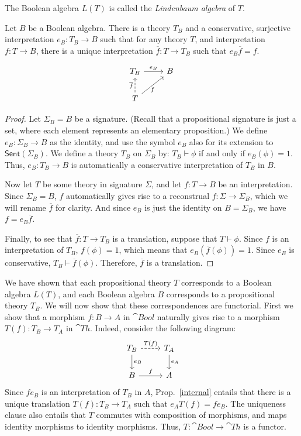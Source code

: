 \begin{defn} The Boolean algebra $L(T)$ is called the \emph{Lindenbaum
    algebra} of $T$. \end{defn}




\begin{prop} Let $B$ be a Boolean algebra.  There is a theory $T_B$
  and a conservative, surjective interpretation $e_B:T_B\to B$ such
  that for any theory $T$, and interpretation $f:T\to B$, there is a
  unique interpretation $\overline{f}:T\to T_B$ such that
  $e_B\overline{f}=f$.  \label{internal} \end{prop}

\[ \begin{tikzcd}
T_B \arrow{r}{e_B} & B  \\
T \arrow{ur}[below]{f} \arrow[dashed]{u}{\overline{f}} \end{tikzcd} \]

\begin{proof} Let $\Sigma _B=B$ be a signature.  (Recall that a
  propositional signature is just a set, where each element represents
  an elementary proposition.)  We define $e_B:\Sigma _B\to B$ as the
  identity, and use the symbol $e_B$ also for its extension to
  $\mathsf{Sent}(\Sigma _B)$.  We define a theory $T_B$ on $\Sigma _B$
  by: $T_B\vdash\phi$ if and only if $e_B(\phi )=1$.  Thus,
  $e_B:T_B\to B$ is automatically a conservative interpretation of
  $T_B$ in $B$.

  Now let $T$ be some theory in signature $\Sigma$, and let $f:T\to B$
  be an interpretation.  Since $\Sigma _B=B$, $f$ automatically gives
  rise to a reconstrual $f:\Sigma\to\Sigma _B$, which we will rename
  $\overline{f}$ for clarity.  And since $e_B$ is just the identity on
  $B=\Sigma _B$, we have $f=e_B\overline{f}$.

  Finally, to see that $\overline{f}:T\to T_B$ is a translation,
  suppose that $T\vdash \phi$.  Since $f$ is an interpretation of
  $T_B$, $f(\phi )=1$, which means that $e_B(\overline{f}(\phi ))=1$.
  Since $e_B$ is conservative, $T_B\vdash \overline{f}(\phi )$.
  Therefore, $\overline{f}$ is a translation.
\end{proof}



We have shown that each propositional theory $T$ corresponds to a
Boolean algebra $L(T)$, and each Boolean algebra $B$ corresponds to a
propositional theory $T_B$.  We will now show that these
correspondences are functorial.  First we show that a morphism $f:B\to
A$ in $\cat{Bool}$ naturally gives rise to a morphism $T(f):T_B\to
T_A$ in $\cat{Th}$.  Indeed, consider the following diagram:
\[ \begin{tikzcd}
  T_B \arrow{d}{e_B} \arrow[dashed]{r}{T(f)} & T_A \arrow{d}{e_A} \\
  B \arrow{r}{f} & A \end{tikzcd} \] Since $fe_B$ is an interpretation
of $T_B$ in $A$, Prop.\ \ref{internal} entails that there is a unique
translation $T(f):T_B\to T_A$ such that $e_AT(f)=fe_B$.  The
uniqueness clause also entails that $T$ commutes with composition of
morphisms, and maps identity morphisms to identity morphisms.  Thus,
$T:\cat{Bool}\to\cat{Th}$ is a functor.

